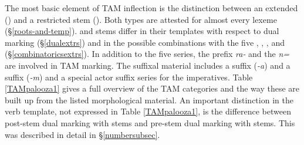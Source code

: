 The most basic element of TAM inflection is the distinction between an extended (\Ext) and a restricted stem (\Rs). Both types are attested for almost every  lexeme (\S{}\ref{roots-and-temp}). \Ext{} and \Rs{} stems differ in their templates with respect to dual marking (\S{}\ref{dualextrs}) and in the possible combinations with the five  \Alph, \Bet, \Betaone, \Betatwo{} and \Gam{} (\S{}\ref{combinatoricsextrs}). In addition to the five series, the  prefix \emph{ra-} and the   \emph{n=} are involved in TAM marking. The suffixal material includes a  suffix (\emph{-a}) and a  suffix (\emph{-m}) and a special actor suffix series for the imperatives. Table \ref{TAMpalooza1} gives a full overview of the TAM categories and the way these are built up from the listed morphological material. An important distinction in the verb template, not expressed in Table \ref{TAMpalooza1}, is the difference between post-stem dual marking with \Ext{} stems and pre-stem dual marking with \Rs{} stems. This was described in detail in \S{}\ref{numbersubsec}.%


